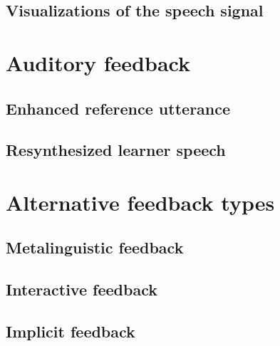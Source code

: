 	\subsection{Visualizations of the speech signal}
	
\section{Auditory feedback}
	\subsection{Enhanced reference utterance}
	\subsection{Resynthesized learner speech}
	
\section{Alternative feedback types}
	\subsection{Metalinguistic feedback}
	\subsection{Interactive feedback}
	\subsection{Implicit feedback}
